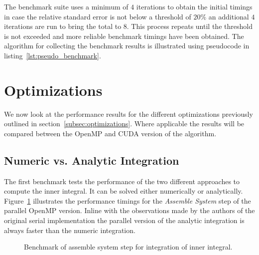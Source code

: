 \documentclass[a4paper,11pt]{kth-mag}
\begin{document}
The benchmark suite uses a minimum of $4$ iterations to obtain the initial timings in case the relative standard error is not below a threshold of $20\%$ an additional $4$ iterations are run to bring the total to $8$. This process repeats until the threshold is not exceeded and more reliable benchmark timings have been obtained. The algorithm for collecting the benchmark results is illustrated using pseudocode in listing~\ref{lst:pseudo_benchmark}.

\section{Optimizations}

We now look at the performance results for the different optimizations previously outlined in section~\ref{subsec:optimizations}. Where applicable the results will be compared between the OpenMP and CUDA version of the algorithm.

\subsection{Numeric vs. Analytic Integration}

The first benchmark tests the performance of the two different approaches to compute the inner integral. It can be solved either numerically or analytically. Figure~\ref{fig:openmp_num_vs_anal} illustrates the performance timings for the \emph{Assemble System} step of the parallel OpenMP version. Inline with the observations made by the authors of the original serial implementation the parallel version of the analytic integration is always faster than the numeric integration.

\begin{figure}
  \centering
  \caption{Benchmark of assemble system step for integration of inner integral.}
  \label{fig:openmp_num_vs_anal}
\end{figure}
\end{document}
